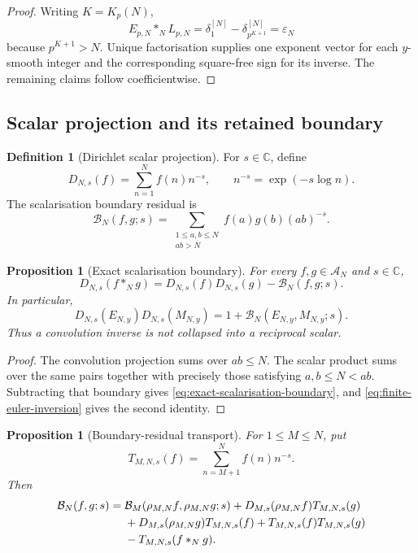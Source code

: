\documentclass[11pt,a4paper]{article}
\newtheorem{proposition}[theorem]{Proposition}
\theoremstyle{definition}
\newtheorem{definition}[theorem]{Definition}
\newcommand{\C}{\mathbb{C}}
\newcommand{\DirichletAlg}{\mathscr{A}}
\newcommand{\Boundary}{\mathcal{B}}
\begin{document}
\begin{proof}
Writing $K=K_p(N)$,
\[
  E_{p,N}*_NL_{p,N}
  =\delta_1^{[N]}-\delta_{p^{K+1}}^{[N]}
  =\varepsilon_N
\]
because $p^{K+1}>N$. Unique factorisation supplies one exponent vector for
each $y$-smooth integer and the corresponding square-free sign for its inverse.
The remaining claims follow coefficientwise.
\end{proof}

\subsection{Scalar projection and its retained boundary}

\begin{definition}[Dirichlet scalar projection]
\label{def:dirichlet-scalar-projection}
For $s\in\C$, define
\[
  D_{N,s}(f)=\sum_{n=1}^{N}f(n)n^{-s},
  \qquad
  n^{-s}=\exp(-s\log n).
\]
The scalarisation boundary residual is
\[
  \Boundary_N(f,g;s)
  =
  \sum_{\substack{1\leq a,b\leq N\\ab>N}}
  f(a)g(b)(ab)^{-s}.
\]
\end{definition}

\begin{proposition}[Exact scalarisation boundary]
\label{prop:exact-scalarisation-boundary}
For every $f,g\in\DirichletAlg_N$ and $s\in\C$,
\begin{equation}
\label{eq:exact-scalarisation-boundary}
  D_{N,s}(f*_Ng)
  =
  D_{N,s}(f)D_{N,s}(g)-\Boundary_N(f,g;s).
\end{equation}
In particular,
\[
  D_{N,s}(E_{N,y})D_{N,s}(M_{N,y})
  =1+\Boundary_N(E_{N,y},M_{N,y};s).
\]
Thus a convolution inverse is not collapsed into a reciprocal scalar.
\end{proposition}

\begin{proof}
The convolution projection sums over $ab\leq N$. The scalar product sums over
the same pairs together with precisely those satisfying $a,b\leq N<ab$.
Subtracting that boundary gives \cref{eq:exact-scalarisation-boundary}, and
\cref{eq:finite-euler-inversion} gives the second identity.
\end{proof}

\begin{proposition}[Boundary-residual transport]
\label{prop:boundary-residual-transport}
For $1\leq M\leq N$, put
\[
  T_{M,N,s}(f)=\sum_{n=M+1}^{N}f(n)n^{-s}.
\]
Then
\begin{align}
\Boundary_N(f,g;s)
={}&\Boundary_M(\rho_{M,N}f,\rho_{M,N}g;s)
 +D_{M,s}(\rho_{M,N}f)T_{M,N,s}(g) \notag\\
&+D_{M,s}(\rho_{M,N}g)T_{M,N,s}(f)
 +T_{M,N,s}(f)T_{M,N,s}(g) \notag\\
&-T_{M,N,s}(f*_Ng).
\label{eq:boundary-residual-transport}
\end{align}
\end{proposition}
\end{document}
